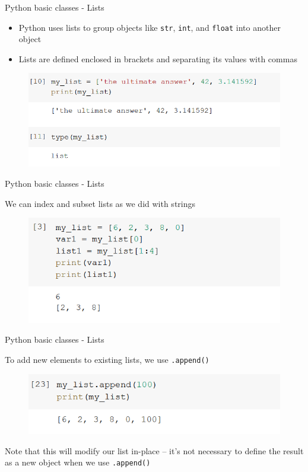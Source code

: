 \documentclass[aspectratio=169]{beamer}
\begin{document}
\begin{frame}{Python basic classes - Lists}

	\begin{itemize}
		\item Python uses lists to group objects like \texttt{str}, \texttt{int}, and \texttt{float} into another object
		\item Lists are defined enclosed in brackets and separating its values with commas
	\end{itemize}

	\begin{figure}
		\centering
		\includegraphics[width=0.6\linewidth]{img/list_type.png}
	\end{figure}

\end{frame}

\begin{frame}{Python basic classes - Lists}

	We can index and subset lists as we did with strings

	\begin{figure}
		\centering
		\includegraphics[width=0.6\linewidth]{img/list_subset.png}
	\end{figure}

\end{frame}

\begin{frame}{Python basic classes - Lists}

	To add new elements to existing lists, we use \texttt{.append()}

	\begin{figure}
		\centering
		\includegraphics[width=0.6\linewidth]{img/list_append.png}
	\end{figure}

	Note that this will modify our list in-place -- it's not necessary to define the result as a new object when we use \texttt{.append()}

\end{frame}
\end{document}
